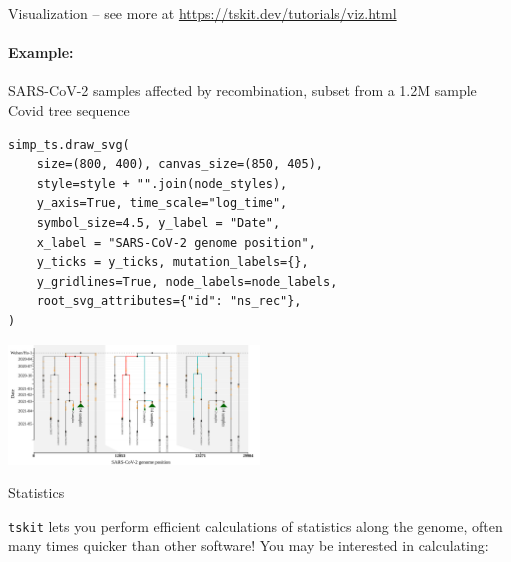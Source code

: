 \documentclass[landscape,a0paper,fontscale=0.4]{baposter}
\newcommand{\tskit}{{\texttt{tskit}}}
\begin{document}
\begin{poster}
\begin{posterbox}[name=viz,column=1,row=0,span=2,below=overview]{Visualization -- \textup{see more at \url{https://tskit.dev/tutorials/viz.html}}}
\begin{multicols}{2}

\columnbreak
\paragraph{Example:}
SARS-CoV-2 samples affected by recombination, subset from a 1.2M
sample Covid tree sequence
\begin{verbatim}
simp_ts.draw_svg(
    size=(800, 400), canvas_size=(850, 405),
    style=style + "".join(node_styles),
    y_axis=True, time_scale="log_time",
    symbol_size=4.5, y_label = "Date",
    x_label = "SARS-CoV-2 genome position",
    y_ticks = y_ticks, mutation_labels={},
    y_gridlines=True, node_labels=node_labels,
    root_svg_attributes={"id": "ns_rec"},
)
\end{verbatim}

\includegraphics[width=0.5\textwidth]{Covid_recombination}

\end{multicols}

\end{posterbox}



\begin{posterbox}[name=stats,column=3,row=0,span=1]{Statistics}

\tskit{} lets you perform efficient calculations of statistics along the genome, often many times quicker than other software! You may be interested in calculating:


\end{posterbox}
\end{poster}
\end{document}
